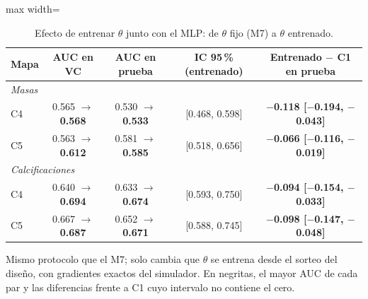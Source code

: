 \begin{table}[H]
\centering
\small
\caption{Efecto de entrenar $\theta$ junto con el MLP: de $\theta$ fijo (M7) a $\theta$ entrenado.}
\label{tab:x8_theta}
\begin{adjustbox}{max width=\linewidth}
\begin{tabular}{l c c c c}
\toprule
Mapa & AUC en VC & AUC en prueba & IC 95\,\% (entrenado) & Entrenado $-$ C1 en prueba \\
\midrule
\multicolumn{5}{l}{\textit{Masas}} \\
\quad C4 & 0.565 $\to$ \textbf{0.568} & 0.530 $\to$ \textbf{0.533} & [0.468, 0.598] & \textbf{\boldmath $-$0.118 [$-$0.194, $-$0.043]} \\
\quad C5 & 0.563 $\to$ \textbf{0.612} & 0.581 $\to$ \textbf{0.585} & [0.518, 0.656] & \textbf{\boldmath $-$0.066 [$-$0.116, $-$0.019]} \\
\multicolumn{5}{l}{\textit{Calcificaciones}} \\
\quad C4 & 0.640 $\to$ \textbf{0.694} & 0.633 $\to$ \textbf{0.674} & [0.593, 0.750] & \textbf{\boldmath $-$0.094 [$-$0.154, $-$0.033]} \\
\quad C5 & 0.667 $\to$ \textbf{0.687} & 0.652 $\to$ \textbf{0.671} & [0.588, 0.745] & \textbf{\boldmath $-$0.098 [$-$0.147, $-$0.048]} \\
\bottomrule
\end{tabular}
\end{adjustbox}
\par\smallskip
\parbox{0.95\linewidth}{\footnotesize Mismo protocolo que el M7; solo cambia que $\theta$ se entrena desde el sorteo del diseño, con gradientes exactos del simulador. En negritas, el mayor AUC de cada par y las diferencias frente a C1 cuyo intervalo no contiene el cero.}
\end{table}
